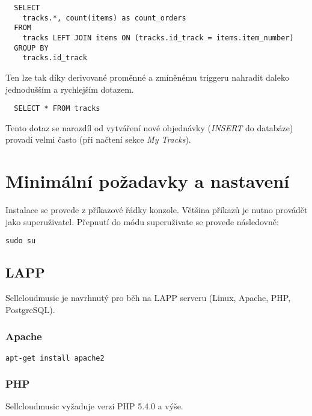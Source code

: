 \documentclass[12pt]{article}
\begin{document}
\lstset{language=SQL}
\begin{lstlisting}
  SELECT
    tracks.*, count(items) as count_orders
  FROM
    tracks LEFT JOIN items ON (tracks.id_track = items.item_number)
  GROUP BY
    tracks.id_track
\end{lstlisting}

Ten lze tak díky derivované proměnné a zmíněnému triggeru nahradit daleko jednodušším a rychlejším dotazem.

\begin{lstlisting}
  SELECT * FROM tracks
\end{lstlisting}

Tento dotaz se narozdíl od vytváření nové objednávky (\emph{INSERT} do databáze) provadí velmi často (při načtení sekce \emph{My Tracks}).

\newpage

\section{Minimální požadavky a nastavení}

Instalace se provede z příkazové řádky konzole. Většina příkazů je nutno provádět jako superuživatel. Přepnutí do módu superuživate se provede následovně:\newline
\lstset{language=sh}
\begin{lstlisting}
sudo su
\end{lstlisting}

\subsection{LAPP}

Sellcloudmusic je navrhnutý pro běh na LAPP serveru (Linux, Apache, PHP, PostgreSQL).

\subsubsection{Apache}

\begin{lstlisting}
apt-get install apache2
\end{lstlisting}

\subsubsection{PHP}

Sellcloudmusic vyžaduje verzi PHP 5.4.0 a výše.
\end{document}
